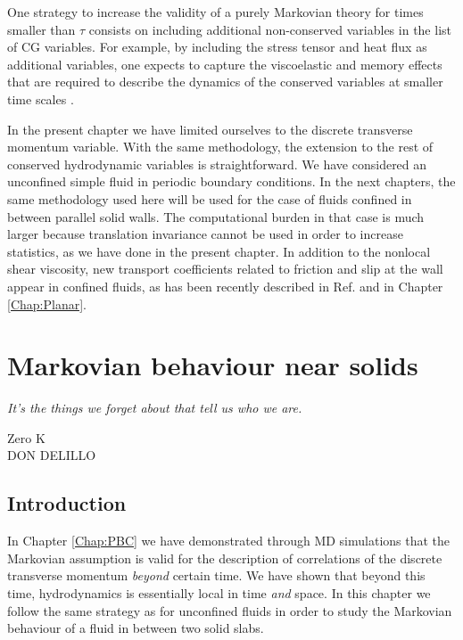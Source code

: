 \documentclass[b5paper,openright,10pt]{book}
\begin{document}
One strategy to increase the validity of a purely Markovian theory for
times   smaller  than   $\tau$   consists   on  including   additional
non-conserved variables in the list  of CG variables.  For example, by
including the stress tensor and heat flux as additional variables, one
expects  to  capture the  viscoelastic  and  memory effects  that  are
required to describe the dynamics  of the conserved variables at smaller
time scales \cite{Khayat1989,Mryglod1995,Bryk2010}.

In  the  present chapter  we  have  limited  ourselves to  the  discrete
transverse  momentum   variable.   With  the  same   methodology,  the
extension  to   the  rest  of  conserved   hydrodynamic  variables  is
straightforward. We have considered an
unconfined simple fluid  in periodic boundary conditions.  In the next
chapters, the same methodology used here will be used for
the  case of  fluids confined  in between  parallel solid  walls.  The
computational burden in  that case is much  larger because translation
invariance cannot be used in order  to increase statistics, as we have
done  in  the present  chapter.   In  addition  to the  nonlocal  shear
viscosity, new transport coefficients related  to friction and slip at
the wall appear in confined fluids,  as has been recently described in
Ref. \cite{Camargo2018} and in Chapter \ref{Chap:Planar}.



\chapter{Markovian behaviour near solids}\label{Chap:Walls}
\epigraph{\textit{It's the things we forget about that tell us who we are.}}{Zero K \\ DON DELILLO}
\section{Introduction}
In Chapter \ref{Chap:PBC} we have demonstrated
through MD simulations that the Markovian assumption
is  valid  for  the  description   of  correlations  of  the  discrete
transverse momentum \textit{beyond} certain  time.  We have shown that
beyond  this   time,  hydrodynamics  is  essentially   local  in  time
\textit{and} space.  
In this chapter we follow the same strategy as for unconfined fluids in order to study the Markovian behaviour of a fluid in between two solid slabs. 
\end{document}
